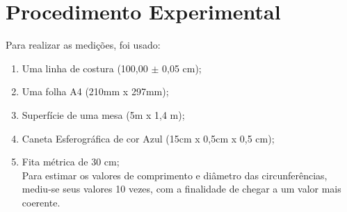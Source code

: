\documentclass[11pt, letterpaper]{article}
\begin{document}
\section{Procedimento Experimental}
Para realizar as medições, foi usado:
\begin{enumerate}
\item Uma linha de costura (100,00 $\pm$ 0,05 cm);
\item Uma folha A4 (210mm x 297mm);
\item Superfície de uma mesa (5m x 1,4 m);
\item Caneta Esferográfica de cor Azul (15cm x 0,5cm x 0,5 cm);
\item Fita métrica de 30 cm; \\
Para estimar os valores de comprimento e diâmetro das circunferências, mediu-se seus valores 10 vezes, com a finalidade de chegar a um valor mais coerente.
\newpage

\end{enumerate}
\end{document}
